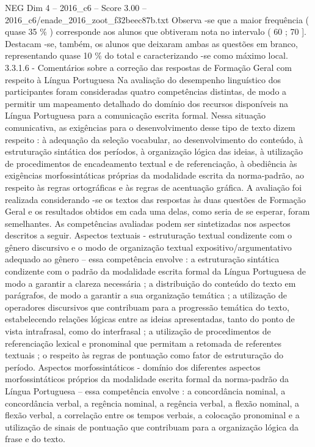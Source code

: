 \begin{textsample}{NEG Dim 4 – 2016\_c6 – Score 3.00 – 2016\_c6/enade\_2016\_zoot\_f32beec87b.txt}
Observa -se que a maior frequência ( quase 35 \% ) corresponde aos alunos que obtiveram nota no intervalo ( 60 ; 70 ].
Destacam -se, também, os alunos que deixaram ambas as questões em branco, representando quase 10 \% do total e caracterizando -se como máximo local. 3.3.1.6 - Comentários sobre a correção das respostas de Formação Geral com respeito à Língua Portuguesa Na avaliação do desempenho linguístico dos participantes foram consideradas quatro competências distintas, de modo a permitir um mapeamento detalhado do domínio dos recursos disponíveis na Língua Portuguesa para a comunicação escrita formal.
Nessa situação comunicativa, as exigências para o desenvolvimento desse tipo de texto dizem respeito : à adequação da seleção vocabular, ao desenvolvimento do conteúdo, à estruturação sintática dos períodos, à organização lógica das ideias, à utilização de procedimentos de encadeamento textual e de referenciação, à obediência às exigências morfossintáticas próprias da modalidade escrita da norma-padrão, ao respeito às regras ortográficas e às regras de acentuação gráfica.
A avaliação foi realizada considerando -se os textos das respostas às duas questões de Formação Geral e os resultados obtidos em cada uma delas, como seria de se esperar, foram semelhantes.
As competências avaliadas podem ser sintetizadas nos aspectos descritos a seguir.
Aspectos textuais - estruturação textual condizente com o gênero discursivo e o modo de organização textual expositivo/argumentativo adequado ao gênero – essa competência envolve : a estruturação sintática condizente com o padrão da modalidade escrita formal da Língua Portuguesa de modo a garantir a clareza necessária ; a distribuição do conteúdo do texto em parágrafos, de modo a garantir a sua organização temática ; a utilização de operadores discursivos que contribuam para a progressão temática do texto, estabelecendo relações lógicas entre as ideias apresentadas, tanto do ponto de vista intrafrasal, como do interfrasal ; a utilização de procedimentos de referenciação lexical e pronominal que permitam a retomada de referentes textuais ; o respeito às regras de pontuação como fator de estruturação do período.
Aspectos morfossintáticos - domínio dos diferentes aspectos morfossintáticos próprios da modalidade escrita formal da norma-padrão da Língua Portuguesa – essa competência envolve : a concordância nominal, a concordância verbal, a regência nominal, a regência verbal, a flexão nominal, a flexão verbal, a correlação entre os tempos verbais, a colocação pronominal e a utilização de sinais de pontuação que contribuam para a organização lógica da frase e do texto.

\end{textsample}

